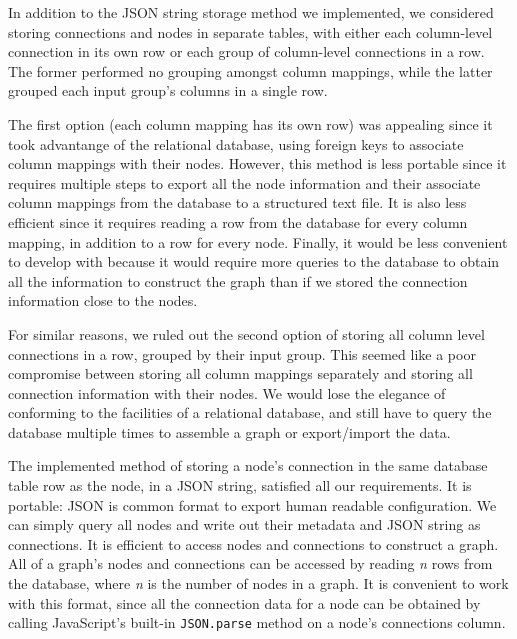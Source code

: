 \documentclass[midd]{thesis}
\begin{document}
In addition to the JSON string storage method we implemented, we considered
storing connections and nodes in separate tables, with either each column-level
connection in its own row or each group of column-level connections in a row.
The former performed no grouping amongst column mappings, while the latter
grouped each input group's columns in a single row.

The first option (each column mapping has its own row) was appealing since it
took advantange of the relational database, using foreign keys to associate
column mappings with their nodes. However, this method is less portable since it
requires multiple steps to export all the node information and their associate
column mappings from the database to a structured text file. It is also less
efficient since it requires reading a row from the database for every column
mapping, in addition to a row for every node. Finally, it would be less
convenient to develop with because it would require more queries to the database
to obtain all the information to construct the graph than if we stored the
connection information close to the nodes.

For similar reasons, we ruled out the second option of storing all column level
connections in a row, grouped by their input group. This seemed like a poor
compromise between storing all column mappings separately and storing all
connection information with their nodes. We would lose the elegance of
conforming to the facilities of a relational database, and still have to query
the database multiple times to assemble a graph or export/import the data.

The implemented method of storing a node's connection in the same database table
row as the node, in a JSON string, satisfied all our requirements. It is
portable: JSON is common format to export human readable configuration. We can
simply query all nodes and write out their metadata and JSON string as
connections. It is efficient to access nodes and connections to construct a
graph. All of a graph's nodes and connections can be accessed by reading
\textit{n} rows from the database, where \textit{n} is the number of nodes in a
graph. It is convenient to work with this format, since all the connection data
for a node can be obtained by calling JavaScript's built-in \texttt{JSON.parse}
method on a node's connections column.
\end{document}
